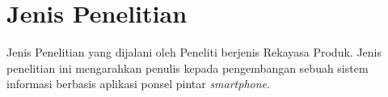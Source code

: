 \section{Jenis Penelitian}
Jenis Penelitian yang dijalani oleh Peneliti berjenis Rekayasa Produk. Jenis penelitian ini mengarahkan penulis kepada pengembangan sebuah sistem informasi berbasis aplikasi ponsel pintar \emph{smartphone}.		

